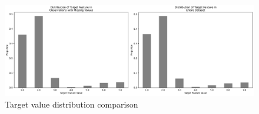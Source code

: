 \documentclass[11pt]{article}
\begin{document}
\begin{figure}[H]
		\centering
	\includegraphics[width=\textwidth]{images/target_feature_distribution.pdf}
	\caption{Target value distribution comparison}
	\label{fig:target_dist}
\end{figure}








%
%
\end{document}
